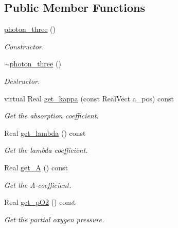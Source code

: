 \subsection*{Public Member Functions}
\begin{DoxyCompactItemize}
\item 
\hyperlink{classmorrow__lowke_1_1photon__three_a22e75299871e361b2ad8fb7a2ee93450}{photon\+\_\+three} ()
\begin{DoxyCompactList}\small\item\em Constructor. \end{DoxyCompactList}\item 
\hyperlink{classmorrow__lowke_1_1photon__three_af58ee3b83908cdd784f114b565e9de29}{$\sim$photon\+\_\+three} ()
\begin{DoxyCompactList}\small\item\em Destructor. \end{DoxyCompactList}\item 
virtual Real \hyperlink{classmorrow__lowke_1_1photon__three_afb20cec70a74d8df75c4564995bd8159}{get\+\_\+kappa} (const Real\+Vect a\+\_\+pos) const 
\begin{DoxyCompactList}\small\item\em Get the absorption coefficient. \end{DoxyCompactList}\item 
Real \hyperlink{classmorrow__lowke_1_1photon__three_abadd9511caeaadd92784054396f97246}{get\+\_\+lambda} () const 
\begin{DoxyCompactList}\small\item\em Get the lambda coefficient. \end{DoxyCompactList}\item 
Real \hyperlink{classmorrow__lowke_1_1photon__three_a235f63c527cd288e5cc1e94460ff5127}{get\+\_\+A} () const 
\begin{DoxyCompactList}\small\item\em Get the A-\/coefficient. \end{DoxyCompactList}\item 
Real \hyperlink{classmorrow__lowke_1_1photon__three_aaaa3722f80219ff653a8fe188e1b4e79}{get\+\_\+p\+O2} () const 
\begin{DoxyCompactList}\small\item\em Get the partial oxygen pressure. \end{DoxyCompactList}\end{DoxyCompactItemize}
